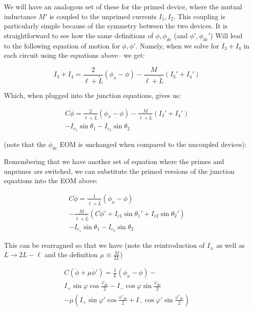 \documentclass[paper=a4, twocolumn, fontsize=10pt]{article} %
\numberwithin{equation}{section} %
\numberwithin{figure}{section} %
\numberwithin{table}{section} %
\begin{document}
We will have an analogous set of these for the primed device, where the mutual inductance $M'$ is coupled to the unprimed currents $I_1, I_2$. This coupling is particularly simple because of the symmetry between the two devices. It is straightforward to see how the same definitions of $\phi,\phi_{dc}$ (and $\phi',\phi_{dc}'$) Will lead to the following equation of motion for $\phi,\phi'$. Namely, when we solve for $I_3+I_4$ in each circuit using the equations above-- we get:

\[ I_3 + I_4 = \frac{2}{\ell+\tilde{L}}\left(\phi_x - \phi \right) - \frac{M}{\ell+\tilde{L}} (I_3'+I_4') \]

Which, when plugged into the junction equations, gives us:

\begin{multline}
    C \ddot{\phi} = \frac{2}{\ell+\tilde{L}}\left( \phi_x - \phi \right) - \frac{M}{\ell+\tilde{L}} (I_3'+I_4') \\ - I_{c_1} \sin \theta_1 - I_{c_2} \sin \theta_2
\end{multline}

(note that the $\phi_{dc}$ EOM is unchanged when compared to the uncoupled devices):

Remembering that we have another set of equation where the primes and unprimes are switched, we can substitute the primed versions of the junction equations into the EOM above:

\begin{multline}
    C \ddot{\phi} = \frac{1}{\ell+\tilde{L}}\left( \phi_x - \phi \right) \\ - \frac{M}{\ell+\tilde{L}} ( C\ddot{\phi}' + I_{c1}\sin \theta_1' + I_{c2} \sin \theta_2') \\ - I_{c_1} \sin \theta_1 - I_{c_2} \sin \theta_2
\end{multline}

This can be rearragned so that we have (note the reintroduction of $I_{\pm}$ as well as $L\to 2L-\ell$ and the definition $\mu\equiv \frac{M}{2L}$)

\begin{multline}
    C \left(\ddot{\phi}+ \mu \ddot{\phi}' \right) = \frac{1}{L}\left( \phi_x - \phi \right) -  \\
    I_{+} \sin \varphi \cos \frac{\varphi_{dc}}{2} - I_{-} \cos \varphi \sin \frac{\varphi_{dc}}{2} \\
    - \mu ( I_{+} \sin \varphi' \cos \frac{\varphi'_{dc}}{2} + I_{-} \cos \varphi' \sin \frac{\varphi'_{dc}}{2})
\end{multline}
\end{document}
